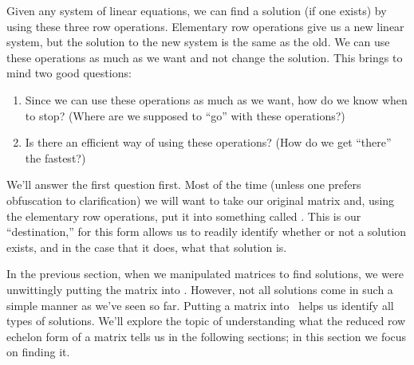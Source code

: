 \smallskip


\smallskip

Given any system of linear equations, we can find a solution (if one exists) by using these three row operations. Elementary row operations give us a new linear system, but the solution to the new system is the same as the old. We can use these operations as much as we want and not change the solution. This brings to mind two good questions:
\begin{enumerate}
\item		Since we can use these operations as much as we want, how do we know when to stop? (Where are we supposed to ``go'' with these operations?)
\item		Is there an efficient way of using these operations? (How do we get ``there'' the fastest?)
\end{enumerate}

We'll answer the first question first. Most of the time (unless one prefers obfuscation to clarification) we will want to take our original matrix and, using the elementary row operations, put it into something called . This is our ``destination,'' for this form allows us to readily identify whether or not a solution exists, and in the case that it does, what that solution is. 

In the previous section, when we manipulated matrices to find solutions, we were unwittingly putting the matrix into \rref. However, not all solutions come in such a simple manner as we've seen so far. Putting a matrix into \rref\ helps us identify all types of solutions. We'll explore the topic of understanding what the reduced row echelon form of a matrix tells us in the following sections; in this section we focus on finding it.

\smallskip

